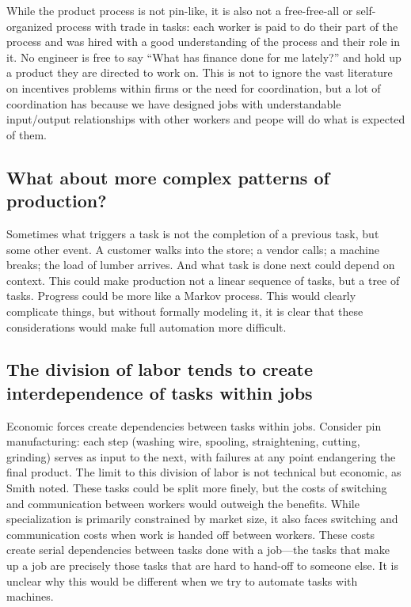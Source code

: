 \documentclass{article}
\begin{document}
While the product process is not pin-like, it is also not a free-free-all or self-organized process with trade in tasks: 
each worker is paid to do their part of the process and was hired with a good understanding of the process and their role in it. 
No engineer is free to say ``What has finance done for me lately?'' and hold up a product they are directed to work on.
This is not to ignore the vast literature on incentives problems within firms or the need for coordination, but a lot of coordination has because we have designed jobs with understandable input/output relationships with other workers and peope will do what is expected of them.

\subsection{What about more complex patterns of production?}
Sometimes what triggers a task is not the completion of a previous task, but some other event. 
A customer walks into the store; a vendor calls; a machine breaks; the load of lumber arrives.
And what task is done next could depend on context. 
This could make production not a linear sequence of tasks, but a tree of tasks. 
Progress could be more like a Markov process. 
This would clearly complicate things, but without formally modeling it, it is clear that these considerations would make full automation more difficult.

\subsection{The division of labor tends to create interdependence of tasks within jobs}
Economic forces create dependencies between tasks within jobs. 
Consider pin manufacturing: each step (washing wire, spooling, straightening, cutting, grinding) serves as input to the next, with failures at any point endangering the final product. 
The limit to this division of labor is not technical but economic, as Smith noted.
These tasks could be split more finely, but the costs of switching and communication between workers would outweigh the benefits.
While specialization is primarily constrained by market size, it also faces switching and communication costs when work is handed off between workers. 
These costs create serial dependencies between tasks done with a job---the tasks that make up a job are precisely those tasks that are hard to hand-off to someone else. 
It is unclear why this would be different when we try to automate tasks with machines.
\end{document}
